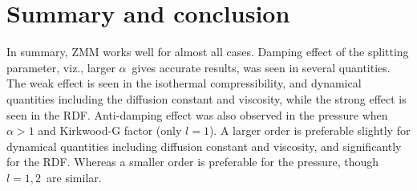 \documentclass[a4paper,preprint,unsortedaddress,onecolumn,fleqn]{revtex4}
\begin{document}




\section{Summary and conclusion}

In summary, ZMM works well for almost all cases. Damping effect of the
splitting parameter, viz., larger $\alpha $\ gives accurate results, was
seen in several quantities. The weak effect is seen in the isothermal
compressibility, {\color{red} } and dynamical quantities including the
diffusion constant and viscosity, while the strong effect is seen in the
RDF. Anti-damping effect was also observed in the pressure when $\alpha >1$
and Kirkwood-G factor (only $l=1$). A larger order is preferable slightly
for dynamical quantities including diffusion constant and viscosity, and
significantly for the RDF. Whereas a smaller order is preferable for the
pressure, though $l=1,2$\ are similar.
\end{document}

